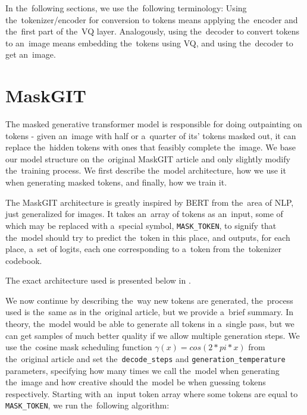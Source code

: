 In the~following sections, we use the~following terminology: Using the~tokenizer/encoder for conversion to tokens means applying the~encoder and the~first part of the~VQ layer. Analogously, using the~decoder to convert tokens to an~image means embedding the~tokens using VQ, and using the~decoder to get an~image.



\section{MaskGIT}

The masked generative transformer model \citep{maskgit} is responsible for doing outpainting on tokens - given an~image with half or a~quarter of its' tokens masked out, it can replace the~hidden tokens with ones that feasibly complete the~image. We base our model structure on the~original MaskGIT article and only slightly modify the~training process. We first describe the~model architecture, how we use it when generating masked tokens, and finally, how we train it.

The MaskGIT architecture is greatly inspired by BERT \citep{BERT} from the~area of NLP, just generalized for images. It takes an~array of tokens as an~input, some of which may be replaced with a~special symbol, \texttt{MASK\_TOKEN}, to signify that the~model should try to predict the~token in this place, and outputs, for each place, a~set of logits, each one corresponding to a~token from the~tokenizer codebook.

The exact architecture used is presented below in .



We now continue by describing the~way new tokens are generated, the~process used is the~same as in the~original article, but we provide a~brief summary. In theory, the~model would be able to generate all tokens in a~single pass, but we can get samples of much better quality if we allow multiple generation steps. We use the~cosine mask scheduling function $\gamma(x) = cos(2*pi*x)$ from the~original article and set the~\texttt{decode\_steps} and \texttt{generation\_temperature} parameters, specifying how many times we call the~model when generating the~image and how creative should the~model be when guessing tokens respectively.  Starting with an~input token array where some tokens are equal to \texttt{MASK\_TOKEN}, we run the~following algorithm:

